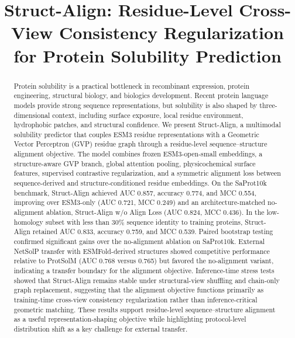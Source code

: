\documentclass[conference]{IEEEtran}
\begin{document}
\title{Struct-Align: Residue-Level Cross-View Consistency Regularization for Protein Solubility Prediction}

\author{}

\maketitle

\begin{abstract}
Protein solubility is a practical bottleneck in recombinant expression, protein engineering, structural biology, and biologics development. Recent protein language models provide strong sequence representations, but solubility is also shaped by three-dimensional context, including surface exposure, local residue environment, hydrophobic patches, and structural confidence. We present Struct-Align, a multimodal solubility predictor that couples ESM3 residue representations with a Geometric Vector Perceptron (GVP) residue graph through a residue-level sequence--structure alignment objective. The model combines frozen ESM3-open-small embeddings, a structure-aware GVP branch, global attention pooling, physicochemical surface features, supervised contrastive regularization, and a symmetric alignment loss between sequence-derived and structure-conditioned residue embeddings. On the SaProt10k benchmark, Struct-Align achieved AUC 0.857, accuracy 0.774, and MCC 0.554, improving over ESM3-only (AUC 0.721, MCC 0.249) and an architecture-matched no-alignment ablation, Struct-Align w/o Align Loss (AUC 0.824, MCC 0.436). In the low-homology subset with less than 30\% sequence identity to training proteins, Struct-Align retained AUC 0.833, accuracy 0.759, and MCC 0.539. Paired bootstrap testing confirmed significant gains over the no-alignment ablation on SaProt10k. External NetSolP transfer with ESMFold-derived structures showed competitive performance relative to ProtSolM (AUC 0.768 versus 0.765) but favored the no-alignment variant, indicating a transfer boundary for the alignment objective. Inference-time stress tests showed that Struct-Align remains stable under structural-view shuffling and chain-only graph replacement, suggesting that the alignment objective functions primarily as training-time cross-view consistency regularization rather than inference-critical geometric matching. These results support residue-level sequence--structure alignment as a useful representation-shaping objective while highlighting protocol-level distribution shift as a key challenge for external transfer.
\end{abstract}
\end{document}
